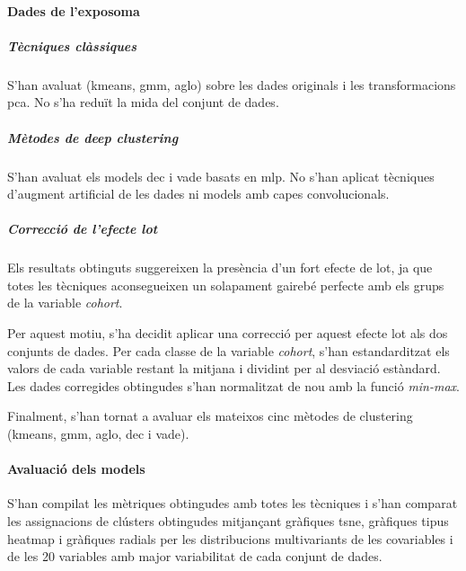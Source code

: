 \documentclass[CAT,BIB]{TFUOC}%
\begin{document}
            \paragraph{Dades de l'exposoma}

                \subparagraph{Tècniques clàssiques}
                    S'han avaluat (\gls{kmeans}, \gls{gmm}, \gls{aglo})
                    sobre les dades originals i les transformacions \gls{pca}.
                    No s'ha reduït la mida del conjunt de dades.

                \subparagraph{Mètodes de \textit{deep clustering}}
                    S'han avaluat els models \gls{dec} i \gls{vade}
                    basats en \gls{mlp}.
                    No s'han aplicat tècniques d'augment artificial de les dades
                    ni models amb capes convolucionals.

                \subparagraph{Correcció de l'efecte lot}
                    Els resultats obtinguts
                    suggereixen la presència d'un fort efecte de lot,
                    ja que totes les tècniques aconsegueixen un solapament gairebé perfecte
                    amb els grups de la variable \textit{cohort}.

                    Per aquest motiu,
                    s'ha decidit aplicar una correcció per aquest efecte lot als dos conjunts de dades.
                    Per cada classe de la variable \textit{cohort},
                    s'han estandarditzat els valors de cada variable
                    restant la mitjana i dividint per al desviació estàndard.
                    Les dades corregides obtingudes
                    s'han normalitzat de nou amb la funció \textit{min-max}.

                    Finalment,
                    s'han tornat a avaluar els mateixos cinc mètodes de clustering
                    (\gls{kmeans}, \gls{gmm}, \gls{aglo}, \gls{dec} i \gls{vade}).

            \paragraph{Avaluació dels models}
                S'han compilat les mètriques obtingudes amb totes les tècniques
                i s'han comparat les assignacions de clústers obtingudes
                mitjançant gràfiques \gls{tsne},
                gràfiques tipus heatmap
                i gràfiques radials per les distribucions multivariants
                de les covariables
                i de les 20 variables amb major variabilitat de cada conjunt de dades.
\end{document}
